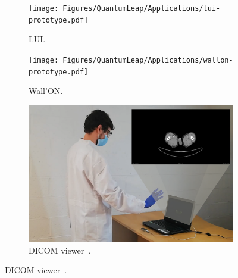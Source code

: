 \begin{figure}[ht]
    \centering
    \begin{subfigure}{.259\textwidth}
        \centering
        \texttt{[image: Figures/QuantumLeap/Applications/lui-prototype.pdf]}  
        \vspace{-15pt}
        \captionsetup{width=.9\linewidth}
        \caption{LUI.}
        \label{fig:quantumleap:apps:lui}
    \end{subfigure}
    \begin{subfigure}{.337\textwidth}
        \centering
        \texttt{[image: Figures/QuantumLeap/Applications/wallon-prototype.pdf]}  
        \vspace{-15pt}
        \captionsetup{width=.9\linewidth}
        \caption{Wall'ON.}
        \label{fig:quantumleap:apps:wallon}
    \end{subfigure}
    \begin{subfigure}{.383\textwidth}
        \centering
        \includegraphics[width=\linewidth,trim={4.5cm 0 0 0},clip]{Figures/QuantumLeap/Applications/dicom-prototype.pdf}  
        \vspace{-15pt}
        \captionsetup{width=.9\linewidth}
        \caption{DICOM viewer~\cite{Nothomb:2020}.}
        \label{fig:quantumleap:apps:dicom}
    \end{subfigure}


\end{figure}
